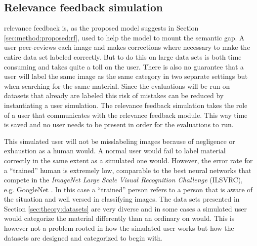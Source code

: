 \subsection{Relevance feedback simulation}
\label{sec:method:rf_simulation}
relevance feedback is, as the proposed model suggests in Section \ref{sec:method:proposed:rf}, used to help the model to mount the semantic gap. A user peer-reviews each image and makes corrections where necessary to make the entire data set labeled correctly. But to do this on large data sets is both time consuming and takes quite a toll on the user. There is also no guarantee that a user will label the same image as the same category in two separate settings but when searching for the same material. 
Since the evaluations will be run on datasets that already are labeled this risk of mistakes can be reduced by instantiating a user simulation. The relevance feedback simulation takes the role of a user that communicates with the relevance feedback module. This way time is saved and no user needs to be present in order for the evaluations to run.  

This simulated user will not be misslabeling images because of negligence or exhaustion as a human would. 
A normal user would fail to label material correctly in the same extent as a simulated one would. 
However, the error rate for a ``trained'' human is extremely low, comparable to the best neural networks that compete in the \emph{ImageNet Large Scale Visual Recognition Challenge} (ILSVRC), e.g. GoogleNet \cite{ImageNetChallenge}. 
In this case a ``trained'' person refers to a person that is aware of the situation and well versed in classifying images. 
The data sets presented in Section \ref{sec:theory:datasets} are very diverse and in some cases a simulated user would categorize the material differently than an ordinary on would. This is however not a problem rooted in how the simulated user works but how the datasets are designed and categorized to begin with.
